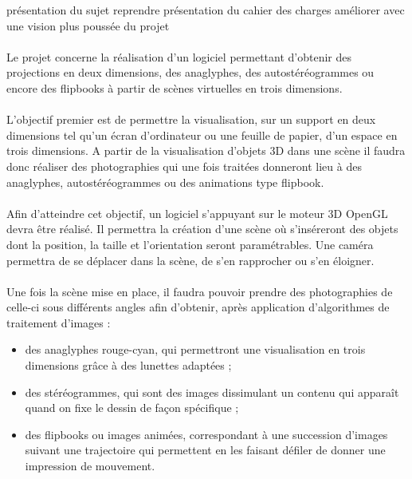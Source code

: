 présentation du sujet
reprendre présentation du cahier des charges
améliorer avec une vision plus poussée du projet

\paragraph{}
	Le projet concerne la réalisation d’un logiciel permettant d’obtenir des projections en deux dimensions, des anaglyphes, des autostéréogrammes ou encore des flipbooks à partir de scènes virtuelles en trois dimensions. 

\paragraph{}
	L’objectif premier est de permettre la visualisation, sur un support en deux dimensions tel qu’un écran d’ordinateur ou une feuille de papier, d’un espace en trois dimensions. A partir de la visualisation d’objets 3D dans une scène il faudra donc réaliser des photographies qui une fois traitées donneront lieu à des anaglyphes, autostéréogrammes ou des animations type flipbook.
	
\paragraph{}
	Afin d’atteindre cet objectif, un logiciel s’appuyant sur le moteur 3D OpenGL devra être réalisé. Il permettra la création d’une scène où s’inséreront des objets dont la position, la taille et l’orientation seront paramétrables. Une caméra permettra de se déplacer dans la scène, de s’en rapprocher ou s’en éloigner.

\paragraph{}
	Une fois la scène mise en place, il faudra pouvoir prendre des photographies de celle-ci sous différents angles afin d’obtenir, après application d’algorithmes de traitement d’images :

\begin{itemize}
	\item
		des anaglyphes rouge-cyan, qui permettront une visualisation en trois dimensions grâce à des lunettes adaptées ;
	\item
		des stéréogrammes, qui sont des images dissimulant un contenu qui apparaît quand on fixe le dessin de façon spécifique ;
	\item
		des flipbooks ou images animées, correspondant à une succession d’images suivant une trajectoire qui permettent en les faisant défiler de donner une impression de mouvement.
\end{itemize}

